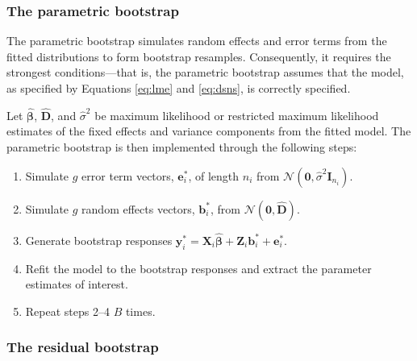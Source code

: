 \hypertarget{the-parametric-bootstrap}{%
\subsubsection{The parametric bootstrap}\label{the-parametric-bootstrap}}

The parametric bootstrap simulates random effects and error terms from the fitted
distributions to form bootstrap resamples. Consequently, it requires the strongest conditions---that is, the parametric bootstrap assumes that the model, as specified by Equations \eqref{eq:lme} and \eqref{eq:dsns}, is correctly specified.

Let \(\widehat{\boldsymbol \beta}\), \(\widehat{\boldsymbol D}\), and \(\widehat{\sigma}^2\) be maximum likelihood or restricted maximum likelihood estimates of the fixed effects and variance components from the fitted model. The parametric bootstrap is then implemented through the following steps:

\begin{enumerate}
\def\labelenumi{\arabic{enumi}.}
\tightlist
\item
  Simulate \(g\) error term vectors, \(\boldsymbol{e}_i^*\), of length \(n_i\) from \(\mathcal{N}\left(\boldsymbol{0},\widehat{\sigma}^2 \boldsymbol{I}_{n_i} \right)\).
\item
  Simulate \(g\) random effects vectors, \(\boldsymbol{b}_i^*\), from \(\mathcal{N}\left(\boldsymbol{0},\widehat{\boldsymbol{D}} \right)\).
\item
  Generate bootstrap responses \(\boldsymbol{y}^*_i = \boldsymbol{X}_i \widehat{\boldsymbol{\beta}} + \boldsymbol{Z}_i \boldsymbol{b}_i^* + \boldsymbol{e}_i^*\).
\item
  Refit the model to the bootstrap responses and extract the parameter estimates of interest.
\item
  Repeat steps 2--4 \(B\) times.
\end{enumerate}

\hypertarget{the-residual-bootstrap}{%
\subsubsection{The residual bootstrap}\label{the-residual-bootstrap}}

